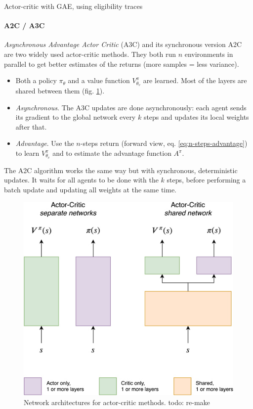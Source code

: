 \begin{algorithm}[H]
\DontPrintSemicolon
{}
\caption{Actor-critic with GAE, using eligibility traces}
\label{algo:gae-eligibility-traces}
\end{algorithm}


\paragraph{A2C / A3C}
\emph{Asynchronous Advantage Actor Critic} (A3C) \cite{mnih2016asynchronous} and its synchronous version A2C are two widely used actor-critic methods. They both run $n$ environments in parallel to get better estimates of the returns (more samples = less variance).
\begin{itemize}
    \item Both a policy $\pi_\theta$ and a value function $V^{\pi}_{\theta_v}$ are learned. Most of the layers are shared between them (fig. \ref{fig:actor-critic-architecture}).
    \item \emph{Asynchronous}. The A3C updates are done asynchronously: each agent sends its gradient to the global network every $k$ steps and updates its local weights after that.
    \item \emph{Advantage}. Use the $n$-steps return (forward view, eq. \ref{eq:n-steps-advantage}) to learn $V^\pi_{\theta_v}$ and to estimate the advantage function $A^\pi$.
\end{itemize}
The A2C algorithm works the same way but with synchronous, deterministic updates. It waits for all agents to be done with the $k$ steps, before performing a batch update and updating all weights at the same time.

\begin{figure}[H]
    \centering
    \includegraphics[width=0.5\linewidth]{figures/actor-critic-architecture.jpg}
    \caption{Network architectures for actor-critic methods. todo: re-make}
    \label{fig:actor-critic-architecture}
\end{figure}

